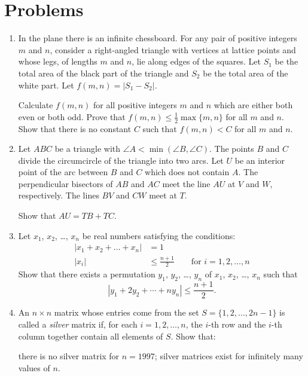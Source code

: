 \documentclass[11pt]{scrartcl}
\begin{document}
\section{Problems}
\begin{enumerate}[\bfseries 1.]
\item %
In the plane there is an infinite chessboard.
For any pair of positive integers $m$ and $n$,
consider a right-angled triangle with vertices at lattice points
and whose legs, of lengths $m$ and $n$, lie along edges of the squares.
Let $S_1$ be the total area of the black part of the triangle
and $S_2$ be the total area of the white part.
Let $f(m,n) = | S_1 - S_2 |$.


\begin{enumerate}[(a)]
  \ii Calculate $f(m,n)$ for all positive integers $m$ and $n$
  which are either both even or both odd.
  \ii Prove that $f(m,n) \leq \frac 12 \max \{m,n\}$ for all $m$ and $n$.
  \ii Show that there is no constant $C$
  such that $f(m,n) < C$ for all $ m$ and $ n$.
\end{enumerate}

\item %
Let $ABC$ be a triangle with $\angle A < \min(\angle B, \angle C)$.
The points $B$ and $C$ divide the circumcircle of the triangle into two arcs.
Let $U$ be an interior point of the arc between $B$ and $C$ which does not contain $A$.
The perpendicular bisectors of $ AB$ and $ AC$ meet the line $AU$ at $V$ and $W$, respectively.
The lines $BV$ and $CW$ meet at $T$.

Show that $AU = TB + TC$.

\item %
Let $x_1$, $x_2$, \dots, $x_n$ be real numbers satisfying the conditions:
\begin{align*}
  |x_1 + x_2 + \dots + x_n| &= 1 \\
  |x_i| &\le \frac{n+1}{2} \qquad \text{for } i= 1,2, \dots, n
\end{align*}
Show that there exists a permutation $y_1$, $y_2$, \dots, $y_n$
of $x_1$, $x_2$, \dots, $x_n$ such that
\[ | y_1 + 2 y_2 + \dotsb + n y_n | \leq \frac {n + 1}{2}. \]

\item %
An $n \times n$ matrix whose entries come
from the set $S = \{1, 2, \dots , 2n - 1\}$
is called a \emph{silver} matrix if,
for each $i = 1, 2, \dots , n$,
the $i$-th row and the $i$-th column together
contain all elements of $S$. Show that:
\begin{enumerate}[(a)]
\ii there is no silver matrix for $n = 1997$;
\ii silver matrices exist for infinitely many values of $n$.
\end{enumerate}


\end{enumerate}
\end{document}
